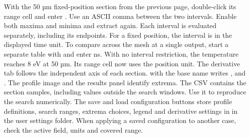 With the 50 µm fixed-position section from the previous page, double-click its range cell and enter . Use an ASCII comma between the two intervals. Enable both maxima and minima and extract again. Each interval is evaluated separately, including its endpoints.
For a fixed position, the interval is in the displayed time unit. To compare across the mesh at a single output, start a separate table with  and enter  ns. With no interval restriction, the temperature reaches 8 eV at 50 µm. Its range cell now uses the position unit. The derivative tab follows the independent axis of each section.
 with the base name  writes ,  and . The profile image and the results panel identify extrema. The CSV contains the section samples, including values outside the search windows. Use it to reproduce the search numerically.
The save and load configuration buttons store profile definitions, search ranges, extrema choices, legend and derivative settings in  in the user settings folder. When applying a saved configuration to another case, check the active field, units and covered range.

